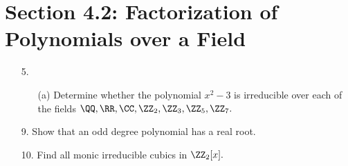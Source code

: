 \documentclass{article}
\begin{document}
\section*{Section 4.2: Factorization of Polynomials over a Field}

\begin{itemize}
	\item[5.] 
		\begin{itemize}
			\item[(a)] Determine whether the polynomial $x^2-3$ is irreducible over each of the fields $\QQ, \RR, \CC, \ZZ_2, \ZZ_3, \ZZ_5, \ZZ_7.$

		\end{itemize}

	\item[9.] Show that an odd degree polynomial has a real root.

	\item[10.] Find all monic irreducible cubics in $\ZZ_2[x].$
		
\end{itemize}
\end{document}
